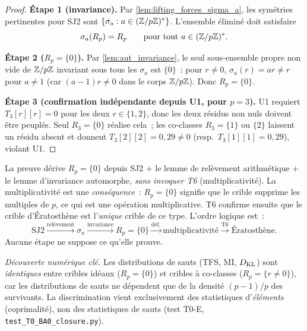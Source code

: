 \documentclass[12pt,a4paper]{article}
\begin{document}
\begin{proof}
\textbf{Étape 1 (invariance).}
Par \cref{lem:lifting_forces_sigma_a}, les symétries pertinentes
pour SJ2 sont $\{\sigma_a : a \in (\mathbb{Z}/p\mathbb{Z})^*\}$. L'ensemble éliminé
doit satisfaire
\begin{equation}
  \sigma_a(R_p) = R_p \qquad \text{pour tout } a \in (\mathbb{Z}/p\mathbb{Z})^*.
  \label{eq:Rp_invariance}
\end{equation}

\textbf{Étape 2 ($R_p = \{0\}$).}
Par \cref{lem:aut_invariance}, le seul sous-ensemble propre non
vide de $\mathbb{Z}/p\mathbb{Z}$ invariant sous tous les $\sigma_a$ est $\{0\}$~:
pour $r \neq 0$, $\sigma_a(r) = ar \neq r$ pour $a \neq 1$ (car
$(a-1)r \neq 0$ dans le corps $\mathbb{Z}/p\mathbb{Z}$). Donc $R_p = \{0\}$.

\textbf{Étape 3 (confirmation indépendante depuis U1, pour $p = 3$).}
U1 requiert $T_3[r][r] = 0$ pour les deux $r \in \{1,2\}$, donc les
deux résidus non nuls doivent être peuplés. Seul $R_3 = \{0\}$
réalise cela~; les co-classes $R_3 = \{1\}$ ou $\{2\}$ laissent un
résidu absent et donnent $T_3[2][2] = 0{,}29 \neq 0$ (resp.\
$T_3[1][1] = 0{,}29$), violant U1.
\end{proof}

\begin{remarque}
\label{rem:interpretive_step}
La preuve dérive $R_p = \{0\}$ depuis SJ2 + le lemme de relèvement
arithmétique + le lemme d'invariance automorphe, \emph{sans
invoquer T6} (multiplicativité). La multiplicativité est une
\emph{conséquence}~: $R_p = \{0\}$ signifie que le crible supprime
les multiples de $p$, ce qui est une opération multiplicative. T6
confirme ensuite que le crible d'Ératosthène est l'\emph{unique}
crible de ce type. L'ordre logique est~:
\[
  \text{SJ2}
  \xrightarrow{\text{relèvement}}
  \sigma_a
  \xrightarrow{\text{invariance}}
  R_p = \{0\}
  \xrightarrow{\text{déf.}}
  \text{multiplicativité}
  \xrightarrow{\text{T6}}
  \text{Ératosthène}.
\]
Aucune étape ne suppose ce qu'elle prouve.

\emph{Découverte numérique clé.}
Les distributions de sauts (TFS, MI, $D_{\mathrm{KL}}$) sont \emph{identiques}
entre cribles idéaux ($R_p = \{0\}$) et cribles à co-classes
($R_p = \{r \neq 0\}$), car les distributions de sauts ne dépendent
que de la densité $(p-1)/p$ des survivants. La discrimination vient
exclusivement des statistiques d'\emph{éléments} (coprimalité),
non des statistiques de sauts (test T0-E,
\texttt{test\_T0\_BA0\_closure.py}).
\end{remarque}
\end{document}
